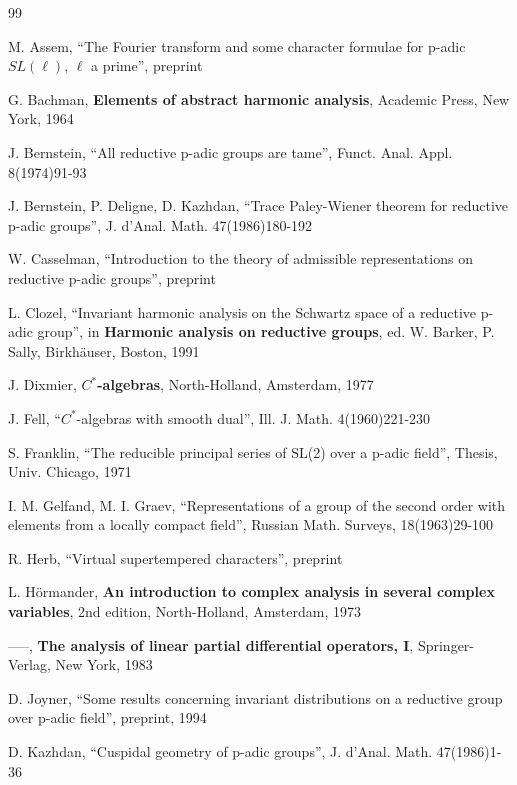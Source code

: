 \begin{thebibliography}{99}


  M. Assem, ``The Fourier transform and some character formulae for p-adic 
$SL(\ell )$, $\ell $ a prime'', preprint

  G. Bachman, {\bf Elements of abstract harmonic analysis},
  Academic Press, New York, 1964

  J. Bernstein, ``All reductive p-adic groups are tame'', Funct. Anal.
Appl. 8(1974)91-93

  J. Bernstein, P. Deligne, D. Kazhdan, ``Trace Paley-Wiener theorem for
reductive p-adic groups'', J. d'Anal. Math. 47(1986)180-192

  W. Casselman, ``Introduction to the theory of admissible
representations on reductive p-adic groups'', preprint

  L. Clozel, ``Invariant harmonic analysis on the Schwartz space of a
reductive p-adic group'', in {\bf Harmonic analysis on reductive groups}, ed. W. Barker, P.
Sally, Birkh\"auser, Boston, 1991

  J. Dixmier, {\bf $C^{*}$-algebras}, North-Holland, Amsterdam, 1977

  J. Fell, ``$C^*$-algebras with smooth dual'', Ill. J. Math.
4(1960)221-230

  S. Franklin, ``The reducible principal series of SL(2) over a p-adic
field'', Thesis, Univ. Chicago, 1971

  I. M. Gelfand, M. I. Graev, ``Representations of a group of the second
order with elements from a locally compact field'', Russian Math. Surveys,
18(1963)29-100

  R. Herb, ``Virtual supertempered characters'', preprint

  L. H\"ormander, {\bf An introduction to complex analysis in several
    complex variables}, 2nd edition, North-Holland,
Amsterdam, 1973

  -----, {\bf The analysis of linear partial differential operators, I},
  Springer-Verlag, New York, 1983

  D. Joyner, ``Some results concerning invariant distributions on a
reductive group over p-adic field'', preprint, 1994

  D. Kazhdan, ``Cuspidal geometry of p-adic groups'', J. d'Anal. Math.
47(1986)1-36


\end{thebibliography}
